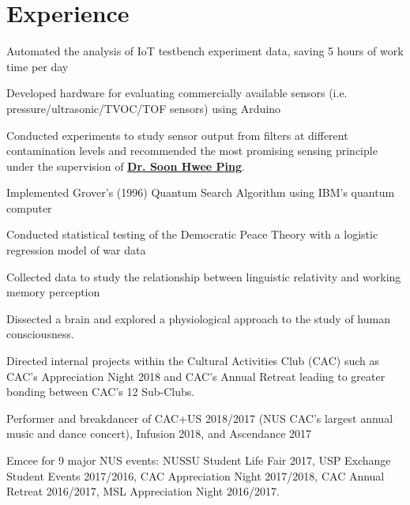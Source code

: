 \documentclass[]{deedy-resume-openfont}
\begin{document}
\begin{minipage}[t]{0.65\textwidth}
\section{Experience}
\vspace{\topsep} %
\begin{tightemize}
\item Automated the analysis of IoT testbench experiment data, saving 5 hours of work time per day
\item Developed hardware for evaluating commercially available sensors (i.e. pressure/ultrasonic/TVOC/TOF sensors) using Arduino
\item Conducted experiments to study sensor output from filters at different contamination levels and recommended the most promising sensing principle under the supervision of \textbf{\href{https://www.eng.nus.edu.sg/mse/staff/soon-hwee-ping/}{Dr. Soon Hwee Ping}}.
\end{tightemize}
\sectionsep

\begin{tightemize}
\item Implemented Grover’s (1996) Quantum Search Algorithm using IBM’s quantum computer
\item Conducted statistical testing of the Democratic Peace Theory with a logistic regression model of war data
\item Collected data to study the relationship between linguistic relativity and working memory perception
\item Dissected a brain and explored a physiological approach to the study of human consciousness.
\end{tightemize}
\sectionsep

\begin{tightemize}
\item Directed internal projects within the Cultural Activities Club (CAC) such as CAC’s Appreciation Night 2018 and CAC’s Annual Retreat leading to greater bonding between CAC’s 12 Sub-Clubs.
\item Performer and breakdancer of CAC+US 2018/2017 (NUS CAC's largest annual music and dance concert), Infusion 2018, and Ascendance 2017
\item Emcee for 9 major NUS events: NUSSU Student Life Fair 2017, USP Exchange Student Events 2017/2016, CAC Appreciation Night 2017/2018, CAC Annual Retreat 2016/2017, MSL Appreciation Night 2016/2017.
\end{tightemize}
\sectionsep


\end{minipage} 
\end{document}
